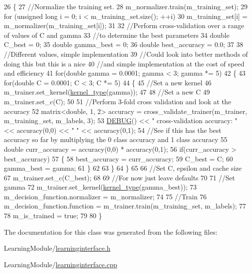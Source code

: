 \begin{DoxyCode}
26 \{
27     \textcolor{comment}{//Normalize the training set.}
28     m\_normalizer.train(m\_training\_set);
29     \textcolor{keywordflow}{for} (\textcolor{keywordtype}{unsigned} \textcolor{keywordtype}{long} i = 0; i < m\_training\_set.size(); ++i)
30         m\_training\_set[i] = m\_normalizer(m\_training\_set[i]);
31 
32     \textcolor{comment}{//Perform cross-validation over a range of values of C and gamma}
33     \textcolor{comment}{//to determine the best parameters}
34     \textcolor{keywordtype}{double} C\_best = 0;
35     \textcolor{keywordtype}{double} gamma\_best = 0;
36     \textcolor{keywordtype}{double} best\_accuracy = 0.0;
37 
38     \textcolor{comment}{//Different values, simple implementation}
39     \textcolor{comment}{//Could look into better methods of doing this but this is a nice}
40     \textcolor{comment}{//and simple implementation at the cost of speed and efficiency}
41     \textcolor{keywordflow}{for}(\textcolor{keywordtype}{double} gamma = 0.0001; gamma < 3; gamma *= 5)
42     \{
43         \textcolor{keywordflow}{for}(\textcolor{keywordtype}{double} C = 0.0001; C < 3; C *= 5)
44         \{
45             \textcolor{comment}{//Set a new kernel}
46             m\_trainer.set\_kernel(\hyperlink{learninginterface_8h_adee5027f0e7876bad7c6a3a4886e8a12}{kernel\_type}(gamma));
47 
48             \textcolor{comment}{//Set a new C}
49             m\_trainer.set\_c(C);
50 
51             \textcolor{comment}{//Perform 3-fold cross validation and look at the accuracy}
52             matrix<double, 1, 2> accuracy = cross\_validate\_trainer(m\_trainer, m\_training\_set, m\_labels, 3);
53             \hyperlink{Log_8h_aba6772a53f37234ac4fa7570b4d49c5a}{DEBUG}() << \textcolor{stringliteral}{" cross-validation accuracy: "} << accuracy(0,0) << \textcolor{stringliteral}{" "} << accuracy(0,1);
54             \textcolor{comment}{//See if this has the best accuracy so far by multiplying the 0 class accuracy and 1 class
       accuracy}
55             \textcolor{keywordtype}{double} curr\_accuracy = accuracy(0,0) * accuracy(0,1);
56             \textcolor{keywordflow}{if}(curr\_accuracy > best\_accuracy)
57             \{
58                 best\_accuracy = curr\_accuracy;
59                 C\_best = C;
60                 gamma\_best = gamma;
61             \}
62 
63         \}
64     \}
65 
66     \textcolor{comment}{//Set C, epsilon and cache size}
67     m\_trainer.set\_c(C\_best);
68 
69     \textcolor{comment}{//For now just leave defaults}
70 
71     \textcolor{comment}{//Set gamma}
72     m\_trainer.set\_kernel(\hyperlink{learninginterface_8h_adee5027f0e7876bad7c6a3a4886e8a12}{kernel\_type}(gamma\_best));
73     m\_decision\_function.normalizer = m\_normalizer;
74 
75     \textcolor{comment}{//Train}
76     m\_decision\_function.function = m\_trainer.train(m\_training\_set, m\_labels);
77 
78     m\_is\_trained = \textcolor{keyword}{true};
79 
80 \}
\end{DoxyCode}


The documentation for this class was generated from the following files\-:\begin{DoxyCompactItemize}
\item 
Learning\-Module/\hyperlink{learninginterface_8h}{learninginterface.\-h}\item 
Learning\-Module/\hyperlink{learninginterface_8cpp}{learninginterface.\-cpp}\end{DoxyCompactItemize}
